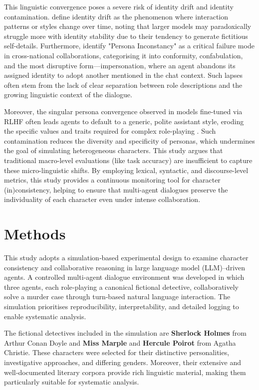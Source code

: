 \documentclass{article}
\begin{document}
This linguistic convergence poses a severe risk of identity drift and identity contamination. \cite{choi2024examining} define identity drift as the phenomenon where interaction patterns or styles change over time, noting that larger models may paradoxically struggle more with identity stability due to their tendency to generate fictitious self-details. Furthermore, \cite{baltaji2024cultured} identify "Persona Inconstancy" as a critical failure mode in cross-national collaborations, categorising it into conformity, confabulation, and the most disruptive form—impersonation, where an agent abandons its assigned identity to adopt another mentioned in the chat context. Such lapses often stem from the lack of clear separation between role descriptions and the growing linguistic context of the dialogue.

Moreover, the singular persona convergence observed in models fine-tuned via RLHF often leads agents to default to a generic, polite assistant style, eroding the specific values and traits required for complex role-playing \citep{park2023generative, moon2024anthology}. Such contamination reduces the diversity and specificity of personas, which undermines the goal of simulating heterogeneous characters. This study argues that traditional macro-level evaluations (like task accuracy) are insufficient to capture these micro-linguistic shifts. By employing lexical, syntactic, and discourse-level metrics, this study provides a continuous monitoring tool for character (in)consistency, helping to ensure that multi-agent dialogues preserve the individuality of each character even under intense collaboration.

\section{Methods}

This study adopts a simulation‑based experimental design to examine character consistency and collaborative reasoning in large language model (LLM)–driven agents. A controlled multi‑agent dialogue environment was developed in which three agents, each role‑playing a canonical fictional detective, collaboratively solve a murder case through turn‑based natural language interaction. The simulation prioritises reproducibility, interpretability, and detailed logging to enable systematic analysis.

The fictional detectives included in the simulation are \textbf{Sherlock Holmes} from Arthur Conan Doyle and \textbf{Miss Marple} and \textbf{Hercule Poirot} from Agatha Christie. These characters were selected for their distinctive personalities, investigative approaches, and differing genders. Moreover, their extensive and well‑documented literary corpora provide rich linguistic material, making them particularly suitable for systematic analysis.
\end{document}
